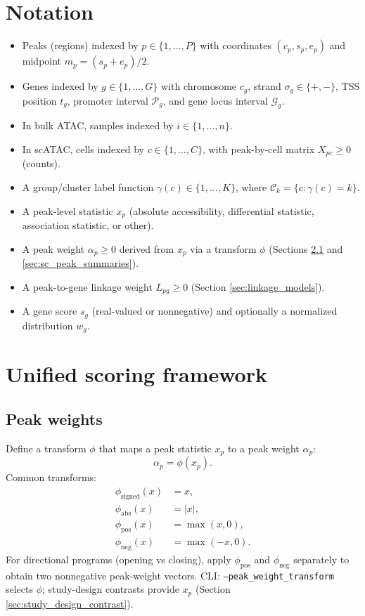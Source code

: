 \documentclass[11pt]{article}
\begin{document}
\section{Notation}
\begin{itemize}[leftmargin=2em]
\item Peaks (regions) indexed by $p \in \{1,\dots,P\}$ with coordinates $(c_p,s_p,e_p)$ and midpoint $m_p=(s_p+e_p)/2$.
\item Genes indexed by $g \in \{1,\dots,G\}$ with chromosome $c_g$, strand $\sigma_g \in \{+,-\}$, TSS position $t_g$, promoter interval $\mathcal{P}_g$, and gene locus interval $\mathcal{G}_g$.
\item In bulk ATAC, samples indexed by $i \in \{1,\dots,n\}$.
\item In scATAC, cells indexed by $c \in \{1,\dots,C\}$, with peak-by-cell matrix $X_{pc} \ge 0$ (counts).
\item A group/cluster label function $\gamma(c) \in \{1,\dots,K\}$, where $\mathcal{C}_k=\{c:\gamma(c)=k\}$.
\item A peak-level statistic $x_p$ (absolute accessibility, differential statistic, association statistic, or other).
\item A peak weight $\alpha_p \ge 0$ derived from $x_p$ via a transform $\phi$ (Sections \ref{sec:peak_weights} and \ref{sec:sc_peak_summaries}).
\item A peak-to-gene linkage weight $L_{pg} \ge 0$ (Section \ref{sec:linkage_models}).
\item A gene score $s_g$ (real-valued or nonnegative) and optionally a normalized distribution $w_g$.
\end{itemize}

\section{Unified scoring framework}
\subsection{Peak weights}
\label{sec:peak_weights}
Define a transform $\phi$ that maps a peak statistic $x_p$ to a peak weight $\alpha_p$:
\[
\alpha_p = \phi(x_p).
\]
Common transforms:
\begin{align*}
\phi_{\mathrm{signed}}(x) &= x, \\
\phi_{\mathrm{abs}}(x) &= |x|, \\
\phi_{\mathrm{pos}}(x) &= \max(x, 0), \\
\phi_{\mathrm{neg}}(x) &= \max(-x, 0).
\end{align*}
For directional programs (opening vs closing), apply $\phi_{\mathrm{pos}}$ and $\phi_{\mathrm{neg}}$ separately to obtain two nonnegative peak-weight vectors.
CLI: \texttt{--peak\_weight\_transform} selects $\phi$; study-design contrasts provide $x_p$ (Section \ref{sec:study_design_contrast}).
\end{document}
